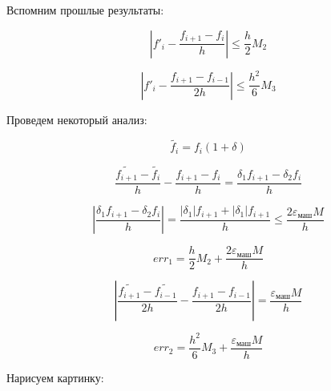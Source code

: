 \documentclass[10pt,a4paper]{article}
\begin{document}
		Вспомним прошлые результаты:
		
		\begin{equation}
			\left|f'_{i} - \frac{f_{i + 1} - f_{i}}{h}\right| \leq \frac{h}{2}M_{2}
		\end{equation}
		
		\begin{equation}
			\left|f'_{i} - \frac{f_{i + 1} - f_{i - 1}}{2h}\right| \leq \frac{h^{2}}{6}M_{3}
		\end{equation}
		
		Проведем некоторый анализ:
		
		\begin{equation}
			\tilde{f_{i}} = f_{i}\left(1 + \delta\right)
		\end{equation}
		
		\begin{equation}
			\frac{\tilde{f_{i+1}} - \tilde{f_{i}}}{h} - 
			\frac{f_{i+1} - f_{i}}{h} = 
			\frac{\delta_{1}f_{i + 1} - \delta_{2}f_{i}}{h}
		\end{equation}
		
		\begin{equation}
			\left|\frac{\delta_{1}f_{i + 1} - \delta_{2}f_{i}}{h}\right| = \frac{\left|\delta_{1}\right|f_{i + 1} + \left|\delta_{1}\right|f_{i + 1}}{h} \leq \frac{2\varepsilon_{\text{маш}}M}{h}
		\end{equation}
		
		\begin{equation}
			err_{1} = \frac{h}{2}M_{2} + \frac{2\varepsilon_{\text{маш}}M}{h}
		\end{equation}
		
		\begin{equation}
			\left|\frac{\tilde{f_{i+1}} - \tilde{f_{i - 1}}}{2h} - \frac{f_{i+1} - f_{i - 1}}{2h}\right| = \frac{\varepsilon_{\text{маш}}M}{h}
		\end{equation}
		
		\begin{equation}
			err_{2} = \frac{h^2}{6}M_{3} + \frac{\varepsilon_{\text{маш}}M}{h}
		\end{equation}
		
		Нарисуем картинку:
		
\end{document}
